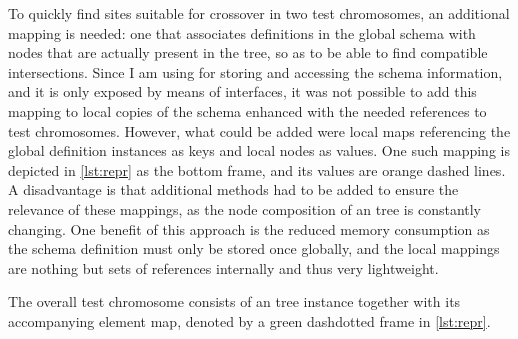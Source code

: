 To quickly find sites suitable for crossover in two test chromosomes, an additional mapping is needed: 
one that associates definitions in the global schema with nodes that are actually present in the \xml tree, so 
as to be able to find compatible intersections.
Since I am using \xerces for storing and accessing the schema information, and it is only exposed by means of 
\java interfaces, it was not possible to add this mapping to local copies of the schema  
enhanced with the needed references to test chromosomes. However, what could be added were local 
maps referencing the global definition instances as keys and local nodes as values. One such mapping is depicted
in \cref{lst:repr} as the bottom frame, and its values are orange dashed lines. A disadvantage is that
additional methods had to be added to ensure the relevance of these mappings, as the node composition of an
\xml tree is constantly changing. One benefit of this approach is the reduced memory consumption as the schema
definition must only be stored once globally, and the local mappings are nothing but sets of references 
internally and thus very lightweight. 

The overall \xml test chromosome consists of an \xml tree instance together with its accompanying element map,
denoted by a green dashdotted frame in \cref{lst:repr}.

